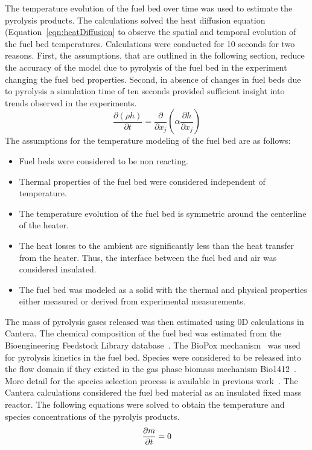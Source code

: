      The temperature evolution of the fuel bed over time was used to estimate the pyrolysis products. The calculations solved the heat diffusion equation (Equation~\ref{eqn:heatDiffusion} to observe the spatial and temporal evolution of the fuel bed temperatures. Calculations were conducted for 10 seconds for two reasons. First, the assumptions, that are outlined in the following section, reduce the accuracy of the model due to pyrolysis of the fuel bed in the experiment changing the fuel bed properties. Second, in absence of changes in fuel beds due to pyrolysis a simulation time of ten seconds provided sufficient insight into trends observed in the experiments. 
        \begin{equation}
            \frac{\partial \left(\rho h \right)}{\partial t} = \frac{\partial}{\partial x_{j}} \left( \alpha \frac{\partial h}{\partial x_{j}} \right)
            \label{eqn:heatDiffusion}
        \end{equation}
     The assumptions for the temperature modeling of the fuel bed are as follows:
        \begin{itemize}
            \item Fuel beds were considered to be non reacting. 
            \item Thermal properties of the fuel bed were considered independent of temperature.
            \item The temperature evolution of the fuel bed is symmetric around the centerline of the heater.
            \item The heat losses to the ambient are significantly less than the heat transfer from the heater. Thus, the interface between the fuel bed and air was considered insulated.
            \item The fuel bed was modeled as a solid with the thermal and physical properties either measured or derived from experimental measurements.
        \end{itemize}

    
    The mass of pyrolysis gases released was then estimated using 0D calculations in Cantera. The chemical composition of the fuel bed was estimated from the Bioengineering Feedstock Library database~\cite{feedstock}. The BioPox mechanism~\cite{Dhahak2019} was used for pyrolysis kinetics in the fuel bed. Species were considered to be released into the flow domain if they existed in the gas phase biomass mechanism Bio1412~\cite{Ranzi2008}. More detail for the species selection process is available in previous work~\cite{Bean2021}. The Cantera calculations considered the fuel bed material as an insulated fixed mass reactor. The following equations were solved to obtain the temperature and species concentrations of the pyrolyis products. 
        \begin{equation}
            \pder[m]{t} = 0
        \end{equation}
        
